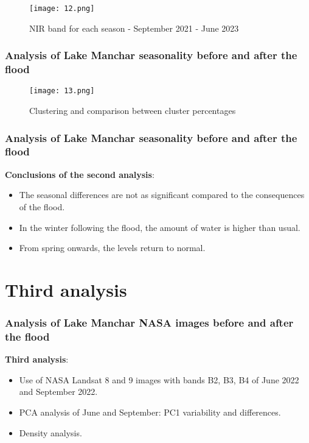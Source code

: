\documentclass{beamer}
\begin{document}
\begin{frame}

  \begin{figure}
      \centering
      \texttt{[image: 12.png]}
      \label{fig:enter-label}
      \caption{NIR band for each season - September 2021 - June 2023}
  \end{figure}    
  
\end{frame}
    
\begin{frame}
  \frametitle{\small Analysis of Lake Manchar seasonality before and after the flood} 

\begin{figure}
    \centering
    \texttt{[image: 13.png]}
    \label{fig:enter-label}
    \caption{Clustering and comparison between cluster percentages}
\end{figure}
  
\end{frame}
  
\begin{frame}
      \frametitle{\small Analysis of Lake Manchar seasonality before and after the flood} 

    \small \textbf{Conclusions of the second analysis}:
    \begin{itemize}
        \item \small The seasonal differences are not as significant compared to the consequences of the flood. 
        \item \small In the winter following the flood, the amount of water is higher than usual. 
        \item \small From spring onwards, the levels return to normal.
    \end{itemize}
\end{frame}

\section{Third analysis}

\begin{frame}
  \frametitle{\small Analysis of Lake Manchar NASA images before and after the flood} 
  
    \small \textbf{Third analysis}:
    \begin{itemize}
        \item \small Use of NASA Landsat 8 and 9 images with bands B2, B3, B4 of June 2022 and September 2022.
        \item \small PCA analysis of June and September: PC1 variability and differences.
        \item \small Density analysis.
    \end{itemize}  
\end{frame}
\end{document}
